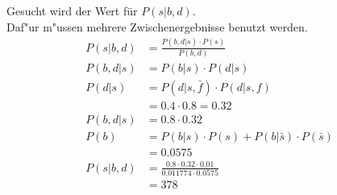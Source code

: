 \documentclass[DIV=9,numbers=noenddot]{scrartcl}
\begin{document}
\begin{itemize}
				\par
				Gesucht wird der Wert für $P(s|b,d)$. \\
				Daf"ur m"ussen mehrere Zwischenergebnisse benutzt werden.
				\begin{align*}
					P(s|b,d) &= \frac{P(b,d|s) \cdot P(s)}{P(b,d)} \\
					P(b,d|s) &= P(b|s) \cdot P(d|s) \\
					P(d|s) &= P(d|s,\bar{f}) \cdot P(d|s,f) \\ 
					&= 0.4 \cdot 0.8 = 0.32 \\
					P(b,d|s) &= 0.8 \cdot 0.32 \\
					P(b) &= P(b|s) \cdot P(s) + P(b|\bar{s}) \cdot P(\bar{s}) \\
					&= 0.0575 \\
					P(s|b,d) &= \frac{0.8 \cdot 0.32 \cdot 0.01}{0.011774 \cdot 0.0575} \\
					&= 378 
				\end{align*}
			\end{itemize}
\end{document}
